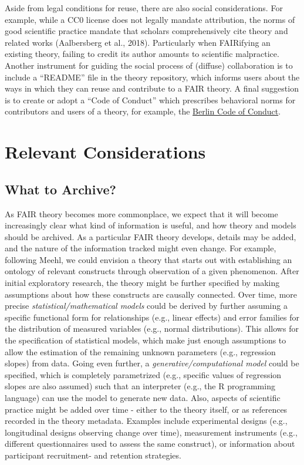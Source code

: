 \documentclass[man]{apa7}
\begin{document}
Aside from legal conditions for reuse, there are also social considerations.
For example, while a CC0 license does not legally mandate attribution,
the norms of good scientific practice mandate that scholars comprehensively cite theory and related works (Aalbersberg et al., 2018).
Particularly when FAIRifying an existing theory, failing to credit its author amounts to scientific malpractice.
Another instrument for guiding the social process of (diffuse) collaboration is to include a ``README'' file in the theory repository, which informs users about the ways in which they can reuse and contribute to a FAIR theory.
A final suggestion is to create or adopt a ``Code of Conduct'' which prescribes behavioral norms for contributors and users of a theory, for example, the \href{https://berlincodeofconduct.org/en}{Berlin Code of Conduct}.

\section{Relevant Considerations}\label{relevant-considerations}

\subsection{What to Archive?}\label{what-to-archive}

As FAIR theory becomes more commonplace,
we expect that it will become increasingly clear what kind of information is useful,
and how theory and models should be archived.
As a particular FAIR theory develops, details may be added, and the nature of the information tracked might even change.
For example, following Meehl, we could envision a theory that starts out with establishing an ontology of relevant constructs through observation of a given phenomenon.
After initial exploratory research, the theory might be further specified by making assumptions about how these constructs are causally connected.
Over time, more precise \emph{statistical/mathematical models} could be derived by further assuming a specific functional form for relationships (e.g., linear effects) and error families for the distribution of measured variables (e.g., normal distributions).
This allows for the specification of statistical models, which make just enough assumptions to allow the estimation of the remaining unknown parameters (e.g., regression slopes) from data.
Going even further, a \emph{generative/computational model} could be specified,
which is completely parametrized (e.g., specific values of regression slopes are also assumed) such that an interpreter (e.g., the R programming language) can use the model to generate new data.
Also, aspects of scientific practice might be added over time - either to the theory itself, or as references recorded in the theory metadata.
Examples include experimental designs (e.g., longitudinal designs observing change over time), measurement instruments (e.g., different questionnaires used to assess the same construct), or information about participant recruitment- and retention strategies.
\end{document}
